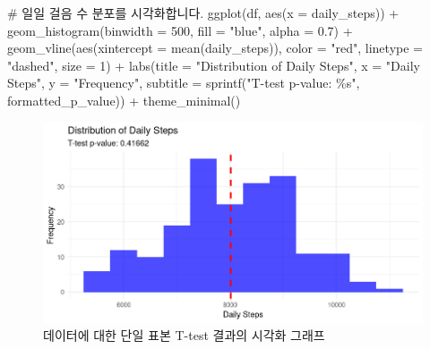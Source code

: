 \documentclass[
  letterpaper,
]{book}
\newenvironment{Shaded}{\begin{snugshade}}{\end{snugshade}}
\newcommand{\AttributeTok}[1]{\textcolor[rgb]{0.40,0.45,0.13}{#1}}
\newcommand{\CommentTok}[1]{\textcolor[rgb]{0.37,0.37,0.37}{#1}}
\newcommand{\DecValTok}[1]{\textcolor[rgb]{0.68,0.00,0.00}{#1}}
\newcommand{\FloatTok}[1]{\textcolor[rgb]{0.68,0.00,0.00}{#1}}
\newcommand{\FunctionTok}[1]{\textcolor[rgb]{0.28,0.35,0.67}{#1}}
\newcommand{\NormalTok}[1]{\textcolor[rgb]{0.00,0.23,0.31}{#1}}
\newcommand{\SpecialCharTok}[1]{\textcolor[rgb]{0.37,0.37,0.37}{#1}}
\newcommand{\StringTok}[1]{\textcolor[rgb]{0.13,0.47,0.30}{#1}}
\renewenvironment{Shaded}
    {\begin{snugshade}
    \begin{singlespace}
    \linespread{1}
    }
    {\end{singlespace}
    \end{snugshade}
}
\begin{document}
\begin{itemize}
\begin{Shaded}
\begin{Highlighting}[]
\CommentTok{\# 일일 걸음 수 분포를 시각화합니다.}
\FunctionTok{ggplot}\NormalTok{(df, }\FunctionTok{aes}\NormalTok{(}\AttributeTok{x =}\NormalTok{ daily\_steps)) }\SpecialCharTok{+}
  \FunctionTok{geom\_histogram}\NormalTok{(}\AttributeTok{binwidth =} \DecValTok{500}\NormalTok{, }\AttributeTok{fill =} \StringTok{"blue"}\NormalTok{, }\AttributeTok{alpha =} \FloatTok{0.7}\NormalTok{) }\SpecialCharTok{+}
  \FunctionTok{geom\_vline}\NormalTok{(}\FunctionTok{aes}\NormalTok{(}\AttributeTok{xintercept =} \FunctionTok{mean}\NormalTok{(daily\_steps)), }\AttributeTok{color =} \StringTok{"red"}\NormalTok{, }\AttributeTok{linetype =} \StringTok{"dashed"}\NormalTok{, }\AttributeTok{size =} \DecValTok{1}\NormalTok{) }\SpecialCharTok{+}
  \FunctionTok{labs}\NormalTok{(}\AttributeTok{title =} \StringTok{"Distribution of Daily Steps"}\NormalTok{,}
   \AttributeTok{x =} \StringTok{"Daily Steps"}\NormalTok{,}
   \AttributeTok{y =} \StringTok{"Frequency"}\NormalTok{,}
   \AttributeTok{subtitle =} \FunctionTok{sprintf}\NormalTok{(}\StringTok{"T{-}test p{-}value: \%s"}\NormalTok{, formatted\_p\_value)) }\SpecialCharTok{+}
  \FunctionTok{theme\_minimal}\NormalTok{()}
\end{Highlighting}
\end{Shaded}
\end{itemize}

\begin{figure}[H]

{\centering \includegraphics{img/fig26.png}

}

\caption{데이터에 대한 단일 표본 T-test 결과의 시각화 그래프}

\end{figure}%
\end{document}
